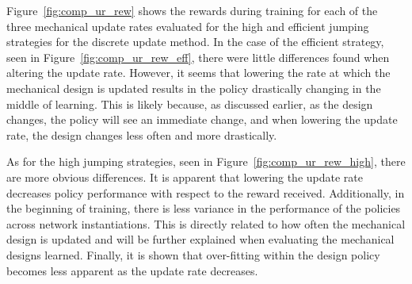 % 
Figure~\ref{fig:comp_ur_rew} shows the rewards during training for each of the three mechanical update rates evaluated for the high and efficient jumping strategies for the discrete update method. In the case of the efficient strategy, seen in Figure~\ref{fig:comp_ur_rew_eff}, there were little differences found when altering the update rate. However, it seems that lowering the rate at which the mechanical design is updated results in the policy drastically changing in the middle of learning. This is likely because, as discussed earlier, as the design changes, the policy will see an immediate change, and when lowering the update rate, the design changes less often and more drastically.

As for the high jumping strategies, seen in Figure~\ref{fig:comp_ur_rew_high}, there are more obvious differences. It is apparent that lowering the update rate decreases policy performance with respect to the reward received. Additionally, in the beginning of training, there is less variance in the performance of the policies across network instantiations. This is directly related to how often the mechanical design is updated and will be further explained when evaluating the mechanical designs learned. Finally, it is shown that over-fitting within the design policy becomes less apparent as the update rate decreases.   


